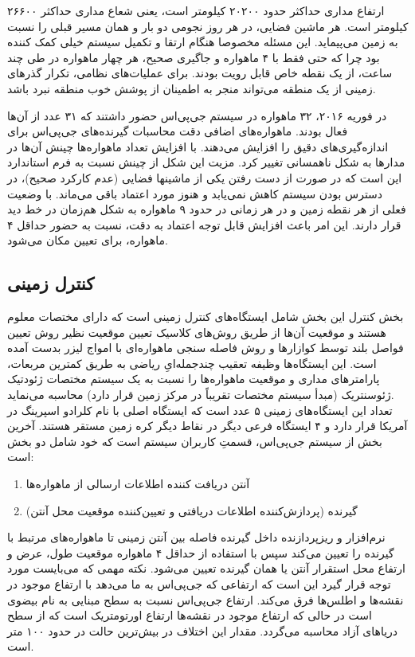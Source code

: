 ارتفاع مداری حداکثر حدود ۲۰۲۰۰ کیلومتر است، یعنی شعاع مداری حداکثر ۲۶۶۰۰ کیلومتر است. هر ماشین فضایی، در هر روز نجومی دو بار و همان مسیر قبلی را نسبت به زمین می‌پیماید. این مسئله مخصوصا هنگام ارتقا و تکمیل سیستم خیلی کمک‌ کننده بود چرا که حتی فقط با ۴ ماهواره و جاگیری صحیح، هر چهار ماهواره در طی چند ساعت، از یک نقطه خاص قابل رویت بودند. برای عملیات‌های نظامی، تکرار گذرهای زمینی از یک منطقه می‌تواند منجر به اطمینان از پوشش خوب منطقه نبرد باشد.


در فوریه ۲۰۱۶، ۳۲ ماهواره در سیستم جی‌پی‌اس حضور داشتند که ۳۱ عدد از آن‌ها فعال بودند. ماهواره‌های اضافی دقت محاسبات گیرنده‌های جی‌پی‌اس برای اندازه‌گیری‌های دقیق را افزایش می‌دهند. با افزایش تعداد ماهواره‌ها چینش آن‌ها در مدارها به شکل ناهمسانی تغییر کرد. مزیت این شکل از چینش نسبت به فرم استاندارد این است که در صورت از دست رفتن یکی از ماشینها فضایی (عدم کارکرد صحیح)، در دسترس بودن سیستم کاهش نمی‌یابد و هنوز مورد اعتماد باقی می‌ماند. با وضعیت فعلی از هر نقطه زمین و در هر زمانی در حدود ۹ ماهواره به شکل هم‌زمان در خط دید قرار دارند. این امر باعث افزایش قابل توجه اعتماد به دقت، نسبت به حضور حداقل ۴ ماهواره، برای تعیین مکان می‌شود.
\subsection{کنترل زمینی}
بخش کنترل این بخش شامل ایستگاه‌های کنترل زمینی است که دارای مختصات معلوم هستند و موقعیت آن‌ها از طریق روش‌های کلاسیک تعیین موقعیت نظیر روش تعیین فواصل بلند توسط کوازارها و روش فاصله سنجی ماهواره‌ای با امواج لیزر بدست آمده ‌است. این ایستگاه‌ها وظیفه تعقیب چندجمله‌ایِ ریاضی به طریق کمترین مربعات، پارامترهای مداری و موقعیت ماهواره‌ها را نسبت به یک سیستم مختصات ژئودتیک ژئوسنتریک (مبدأ سیستم مختصات تقریباً در مرکز زمین قرار دارد) محاسبه می‌نماید.
\\
تعداد این ایستگاه‌های زمینی ۵ عدد است که ایستگاه اصلی با نام کلرادو اسپرینگ در آمریکا قرار دارد و ۴ ایستگاه فرعی دیگر در نقاط دیگر کره زمین مستقر هستند. آخرین بخش از سیستم جی‌پی‌اس، قسمتِ کاربران سیستم است که خود شامل دو بخش است:
\begin{enumerate}
	\item آنتن دریافت ‌کننده اطلاعات ارسالی از ماهواره‌ها
	\item گیرنده (پردازش‌کننده اطلاعات دریافتی و تعیین‌کننده موقعیت محل آنتن)
\end{enumerate}
نرم‌افزار و ریزپردازنده داخل گیرنده فاصله بین آنتن زمینی تا ماهواره‌های مرتبط با گیرنده را تعیین می‌کند سپس با استفاده از حداقل ۴ ماهواره موقعیت طول، عرض و ارتفاع محل استقرار آنتن یا همان گیرنده تعیین می‌شود.
نکته مهمی که می‌بایست مورد توجه قرار گیرد این است که ارتفاعی که جی‌پی‌اس به ما می‌دهد با ارتفاع موجود در نقشه‌ها و اطلس‌ها فرق می‌کند. ارتفاع جی‌پی‌اس نسبت به سطح مبنایی به نام بیضوی است در حالی که ارتفاع موجود در نقشه‌ها ارتفاع اورتومتریک است که از سطح دریاهای آزاد محاسبه می‌گردد. مقدار این اختلاف در بیش‌ترین حالت در حدود ۱۰۰ متر است.
